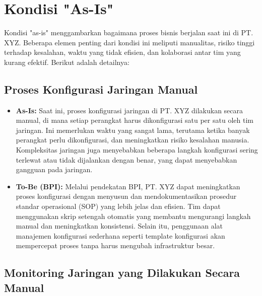 \section{Kondisi "As-Is"}


Kondisi "as-is" menggambarkan bagaimana proses bisnis berjalan saat ini di PT. XYZ. Beberapa elemen penting dari kondisi ini meliputi manualitas, risiko tinggi terhadap kesalahan, waktu yang tidak efisien, dan kolaborasi antar tim yang kurang efektif. Berikut adalah detailnya:

\subsection{Proses Konfigurasi Jaringan Manual}

\begin{itemize}
    \item \textbf{As-Is:} Saat ini, proses konfigurasi jaringan di PT. XYZ dilakukan secara manual, di mana setiap perangkat harus dikonfigurasi satu per satu oleh tim jaringan. Ini memerlukan waktu yang sangat lama, terutama ketika banyak perangkat perlu dikonfigurasi, dan meningkatkan risiko kesalahan manusia. Kompleksitas jaringan juga menyebabkan beberapa langkah konfigurasi sering terlewat atau tidak dijalankan dengan benar, yang dapat menyebabkan gangguan pada jaringan.

    \item \textbf{To-Be (BPI):} Melalui pendekatan BPI, PT. XYZ dapat meningkatkan proses konfigurasi dengan menyusun dan mendokumentasikan prosedur standar operasional (SOP) yang lebih jelas dan efisien. Tim dapat menggunakan skrip setengah otomatis yang membantu mengurangi langkah manual dan meningkatkan konsistensi. Selain itu, penggunaan alat manajemen konfigurasi sederhana seperti template konfigurasi akan mempercepat proses tanpa harus mengubah infrastruktur besar.
\end{itemize}

\subsection{Monitoring Jaringan yang Dilakukan Secara Manual}

